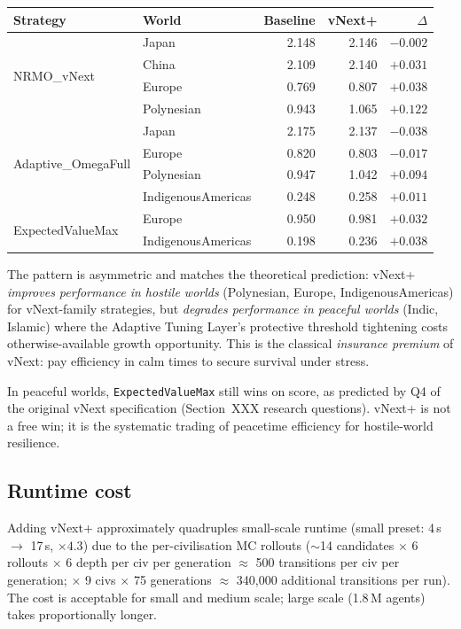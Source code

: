 \begin{center}
\small
\begin{tabular}{llrrr}
\toprule
Strategy & World & Baseline & vNext+ & $\Delta$ \\
\midrule
\multirow{4}{*}{NRMO\_vNext}
  & Japan       & 2.148 & 2.146 & $-0.002$ \\
  & China       & 2.109 & 2.140 & $+0.031$ \\
  & Europe      & 0.769 & 0.807 & $+0.038$ \\
  & Polynesian  & 0.943 & 1.065 & $+0.122$ \\
\midrule
\multirow{4}{*}{Adaptive\_OmegaFull}
  & Japan       & 2.175 & 2.137 & $-0.038$ \\
  & Europe      & 0.820 & 0.803 & $-0.017$ \\
  & Polynesian  & 0.947 & 1.042 & $+0.094$ \\
  & IndigenousAmericas & 0.248 & 0.258 & $+0.011$ \\
\midrule
\multirow{2}{*}{ExpectedValueMax}
  & Europe      & 0.950 & 0.981 & $+0.032$ \\
  & IndigenousAmericas & 0.198 & 0.236 & $+0.038$ \\
\bottomrule
\end{tabular}
\end{center}

The pattern is asymmetric and matches the theoretical prediction:
vNext+ \emph{improves performance in hostile worlds} (Polynesian,
Europe, IndigenousAmericas) for vNext-family strategies, but
\emph{degrades performance in peaceful worlds} (Indic, Islamic) where
the Adaptive Tuning Layer's protective threshold tightening costs
otherwise-available growth opportunity. This is the classical
\emph{insurance premium} of vNext: pay efficiency in calm times to
secure survival under stress.

In peaceful worlds, \texttt{ExpectedValueMax} still wins on score, as
predicted by Q4 of the original vNext specification (Section~XXX
research questions). vNext+ is not a free win; it is the systematic
trading of peacetime efficiency for hostile-world resilience.

\subsection{Runtime cost}

Adding vNext+ approximately quadruples small-scale runtime (small
preset: 4\,s $\to$ 17\,s, $\times 4.3$) due to the per-civilisation MC
rollouts ($\sim$14 candidates $\times$ 6 rollouts $\times$ 6 depth per
civ per generation $\approx$ 500 transitions per civ per generation;
$\times$ 9 civs $\times$ 75 generations $\approx$ 340{,}000 additional
transitions per run). The cost is acceptable for small and medium
scale; large scale (1.8\,M agents) takes proportionally longer.

